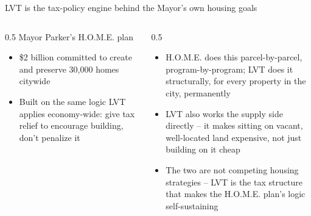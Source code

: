 \documentclass[aspectratio=169,11pt]{beamer}
\begin{document}
\begin{frame}{LVT is the tax-policy engine behind the Mayor's own housing goals}
\begin{columns}[T]
\begin{column}{0.5\linewidth}
\vspace{0.6em}
{\small\color{deckmuted} Mayor Parker's H.O.M.E. plan}\\[0.4em]
\begin{itemize}
\item \$2 billion committed to create and preserve 30,000 homes citywide  %
\item Built on the same logic LVT applies economy-wide: give tax relief to encourage building, don't penalize it
\end{itemize}
\end{column}
\begin{column}{0.5\linewidth}
\vspace{1.0em}
\begin{itemize}
\item H.O.M.E. does this parcel-by-parcel, program-by-program; LVT does it structurally, for every property in the city, permanently
\item LVT also works the supply side directly -- it makes sitting on vacant, well-located land expensive, not just building on it cheap
\item The two are not competing housing strategies -- LVT is the tax structure that makes the H.O.M.E. plan's logic self-sustaining
\end{itemize}
\end{column}
\end{columns}
\end{frame}
\end{document}
